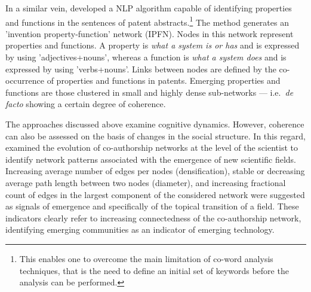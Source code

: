 \documentclass[11pt]{article}
\begin{document}
In a similar vein, \cite{Yoon2011} developed a NLP algorithm capable of identifying properties and functions in the sentences of patent abstracts.\footnote{This enables one to overcome the main limitation of co-word analysis techniques, that is the need to define an initial set of keywords before the analysis can be performed.} The method generates an 'invention property-function' network (IPFN). Nodes in this network represent properties and functions. A property is \textit{what a system is or has} and is expressed by using 'adjectives+nouns', whereas a function is \textit{what a system does} and is expressed by using 'verbs+nouns'. Links between nodes are defined by the co-occurrence of properties and functions in patents. Emerging properties and functions are those clustered in small and highly dense sub-networks --- i.e.\ \textit{de facto} showing a certain degree of coherence.

The approaches discussed above examine cognitive dynamics. However, coherence can also be assessed on the basis of changes in the social structure. In this regard, \cite{Bettencourt2009} examined the evolution of co-authorship networks at the level of the scientist to identify network patterns associated with the emergence of new scientific fields. Increasing average number of edges per nodes (densification), stable or decreasing average path length between two nodes (diameter), and increasing fractional count of edges in the largest component of the considered network were suggested as signals of emergence and specifically of the topical transition of a field. These indicators clearly refer to increasing connectedness of the co-authorship network, identifying emerging communities as an indicator of emerging technology.
\end{document}
